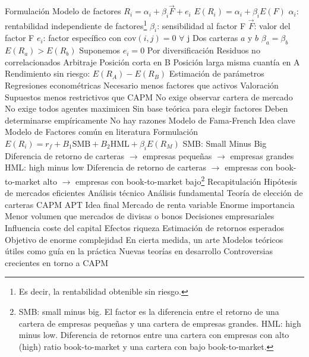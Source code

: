 \documentclass{nuevotema}
\begin{document}
\begin{esquemal}
		\2 Formulación
			\3 Modelo de factores
				\4 $R_i = \alpha_i + \beta_i \vec{F} + e_i$
				\4[$\Rightarrow$] $E(R_i) = \alpha_i + \beta_i E(F)$
				\4[] $\alpha_i$: rentabilidad independiente de factores\footnote{Es decir, la rentabilidad obtenible sin riesgo.}
				\4[] $\beta_i$: sensibilidad al factor F
				\4[] $\vec{F}$: valor del factor F
				\4[] $e_i$: factor específico con $\text{cov}(i,j)=0$ $\forall$ j
			\3 Dos carteras $a$ y $b$
				\4 $\beta_a = \beta_b$
				\4 $E(R_a) > E(R_b)$
			\3 Suponemos $e_i=0$
				\4 Por diversificación
				\4 Residuos no correlacionados
			\3 Arbitraje
				\4 Posición corta en B
				\4 Posición larga misma cuantía en A
				\4 Rendimiento sin riesgo: $E(R_A) - E(R_B)$
			\3 Estimación de parámetros
				\4 Regresiones econométricas
				\4 Necesario menos factores que activos
		\2 Valoración
			\3 Supuestos menos restrictivos que CAPM
				\4 No exige observar cartera de mercado
				\4 No exige todos agentes maximicen
			\3 Sin base teórica para elegir factores
				\4 Deben determinarse empíricamente
				\4[] No hay razones
		\2 Modelo de Fama-French
			\3 Idea clave
				\4 Modelo de Factores común en literatura
			\3 Formulación
				\4 $E(R_i) = r_f + B_1 \text{SMB} + B_2 \text{HML} + \beta_i E(R_M)$
				\4 SMB:
				\4[] Small Minus Big
				\4[] Diferencia de retorno de carteras
				\4[] $\to$ empresas pequeñas
				\4[] $\to$ empresas grandes
				\4 HML:
				\4[] high minus low
				\4[] Diferencia de retorno de carteras
				\4[] $\to$ empresas con book-to-market alto
				\4[] $\to$ empresas con book-to-market bajo\footnote{SMB: small minus big. El factor es la diferencia entre el retorno de una cartera de empresas pequeñas y una cartera de empresas grandes. HML: high minus low. Diferencia de retornos entre una cartera con empresas con alto (high) ratio book-to-market y una cartera con bajo book-to-market.}
	\1[] 
		\2 Recapitulación
			\3 Hipótesis de mercados eficientes
			\3 Análisis técnico
			\3 Análisis fundamental
			\3 Teoría de elección de carteras
			\3 CAPM
			\3 APT
		\2 Idea final
			\3 Mercado de renta variable
				\4 Enorme importancia
				\4 Menor volumen que mercados de divisas o bonos
				\4 Decisiones empresariales
				\4 Influencia coste del capital
				\4 Efectos riqueza
			\3 Estimación de retornos esperados
				\4 Objetivo de enorme complejidad
				\4 En cierta medida, un arte
				\4 Modelos teóricos útiles como guía en la práctica
				\4 Nuevas teorías en desarrollo
				\4 Controversias crecientes en torno a CAPM
\end{esquemal}
\end{document}
